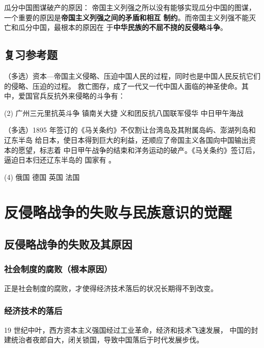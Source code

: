 \documentclass[10pt, UTF8]{book} %
\begin{document}
\begin{mdframed}
    \begin{cmt}
        瓜分中国图谋破产的原因：
        帝国主义列强之所以没有能够实现瓜分中国的图谋，
        一个重要的原因是\textbf{帝国主义列强之间的矛盾和相互
        制约}。而帝国主义列强不能灭亡和瓜分中国，最根本的原因在
        于\textbf{中华民族的不屈不挠的反侵略斗争}。
    \end{cmt}
\end{mdframed}


\subsection{复习参考题}

\begin{example}
    （多选）资本—帝国主义侵略、压迫中国人民的过程，同时也是中国人民反抗它们的侵略、压迫的过程。
    救亡图存，成了一代又一代中国人面临的神圣使命。其中，爱国官兵反抗外来侵略的斗争有：
    \begin{tasks}[label={\Alph*. }](2)
        \task 广州三元里抗英斗争
        \task 镇南关大捷
        \task 义和团反抗八国联军侵华
        \task 中日甲午海战
    \end{tasks}
\end{example}

\begin{example}
    （多选）1895 年签订的《马关条约》不仅割让台湾岛及其附属岛屿、澎湖列岛和辽东半岛
    给日本，使日本得到巨大的利益，还顺应了帝国主义各国向中国输出资本的愿望，标志着
    中日甲午战争的结束和洋务运动的破产。《马关条约》签订后，逼迫日本归还辽东半岛的
    国家有 \underline{\qquad \qquad \qquad}。
    \begin{tasks}[label={\Alph*. }](4)
        \task 俄国
        \task 德国
        \task 英国
        \task 法国
    \end{tasks}
\end{example}

\section{反侵略战争的失败与民族意识的觉醒}


\begin{mdframed}
    \subsection{反侵略战争的失败及其原因}
    
    \subsubsection{社会制度的腐败（根本原因）}

    正是社会制度的腐败，才使得经济技术落后的状况长期得不到改变。

    \subsubsection{经济技术的落后}
    19 世纪中叶，西方资本主义强国经过工业革命，经济和技术飞速发展，
    中国的封建统治者夜郎自大，闭关锁国，导致中国落后于时代发展步伐。

\end{mdframed}
\end{document}
